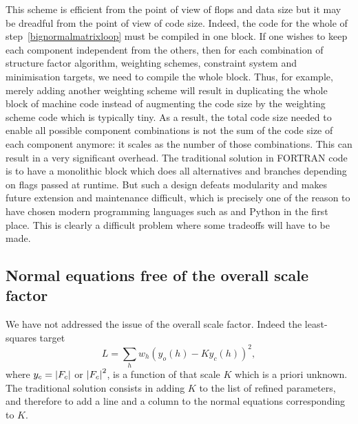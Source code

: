 \documentclass[12pt]{article}
\begin{document}
This scheme is efficient from the point of view of flops and data size but it may be dreadful from the point of view of code size. Indeed, the code for the whole of step~\ref{bignormalmatrixloop} must be compiled in one block. If one wishes to keep each component independent from the others, then for each combination of structure factor algorithm, weighting schemes, constraint system and minimisation targets, we need to compile the whole block. Thus, for example, merely adding another weighting scheme will result in duplicating the whole block of machine code instead of augmenting the code size by the weighting scheme code which is typically tiny. As a result, the total code size needed to enable all possible component combinations is not the sum of the code size of each component anymore: it scales as the number of those combinations. This can result in a very significant overhead. The traditional solution in FORTRAN code is to have a monolithic block which does all alternatives and branches depending on flags passed at runtime. But such a design defeats modularity and makes future extension and maintenance difficult, which is precisely one of the reason to have chosen modern programming languages such as \cpp and Python in the first place. This is clearly a difficult problem where some tradeoffs will have to be made.

\subsection{Normal equations free of the overall scale factor}

 We have not addressed the issue of the overall scale factor. Indeed the least-squares target
 \begin{equation}
L = \sum_h w_h \left(y_o(h) - K y_c(h)\right)^2,
\end{equation}
where $y_c = \left| F_c \right|$ or $\left| F_c \right|^2$, is a function of that scale $K$ which is a priori unknown. The traditional solution consists in adding $K$ to the list of refined parameters, and therefore to add a line and a column to the normal equations corresponding to $K$.
\end{document}

